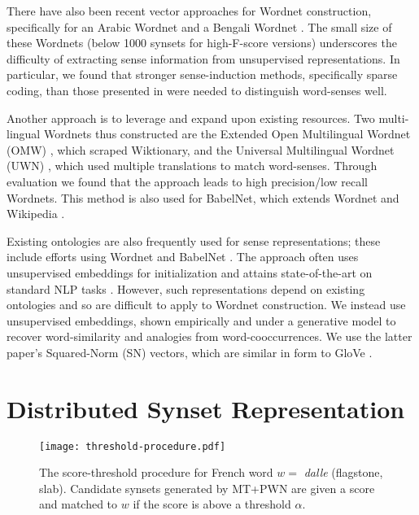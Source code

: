 \documentclass{book}
\begin{document}
There have also been recent vector approaches for Wordnet construction, specifically for an Arabic Wordnet \citep{AlTarouti:16} and a Bengali Wordnet \citep{Nasiruddin:14}.
The small size of these Wordnets (below 1000 synsets for high-F-score versions) underscores the difficulty of extracting sense information from unsupervised representations.
In particular, we found that stronger sense-induction methods, specifically sparse coding, than those presented in \cite{Nasiruddin:14} were needed to distinguish word-senses well.

Another approach is to leverage and expand upon existing resources.
Two multi-lingual Wordnets thus constructed are the Extended Open Multilingual Wordnet (OMW) \cite{omw}, which scraped Wiktionary, and the Universal Multilingual Wordnet (UWN) \citep{uwn}, which used multiple translations to match word-senses.
Through evaluation we found that the approach leads to high precision/low recall Wordnets.
This method is also used for BabelNet, which extends Wordnet and Wikipedia \citep{Navigli:12}.

Existing ontologies are also frequently used for sense representations;
these include efforts using Wordnet \citep{Rothe:15} and BabelNet \citep{Iacobacci:15}.
The approach often uses unsupervised embeddings for initialization and attains state-of-the-art on standard NLP tasks \citep{CamachoCollados:16}.
However, such representations depend on existing ontologies and so are difficult to apply to Wordnet construction.
We instead use unsupervised embeddings, shown empirically \citep{Mikolov:13} and under a generative model \citep{randwalk} to recover word-similarity and analogies from word-cooccurrences.
We use the latter paper's Squared-Norm (SN) vectors, which are similar in form to GloVe \citep{Pennington:14}.


\section{Distributed Synset Representation}
\label{sec:synsetrep}

\begin{figure*}[ht!]
\centering
\texttt{[image: threshold-procedure.pdf]}
\caption{
The score-threshold procedure for French word $w=$ {\em dalle} (flagstone, slab).
Candidate synsets generated by MT+PWN are given a score and matched to $w$ if the score is above a threshold $\alpha$.
}
\label{fig:threshold}
\end{figure*}
\end{document}
